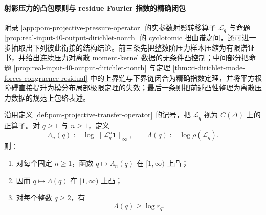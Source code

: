 \paragraph{射影压力的凸包原则与 residue Fourier 指数的精确闭包}
附录 \ref{app:pom-projective-pressure-operator} 的实参数射影转移算子 \(\mathcal L_q\) 与命题 \ref{prop:real-input-40-output-dirichlet-nonrh} 的 cyclotomic 扭曲谱之间，还可进一步抽取出下列彼此衔接的结构结论。前三条先把整数阶压力样本压缩为有限谱证书，并给出连续压力对离散 moment-kernel 数据的无条件凸控制；中间部分把命题 \ref{prop:real-input-40-output-dirichlet-nonrh} 与定理 \ref{thm:xi-dirichlet-mode-forces-congruence-residual} 中的上界链与下界链闭合为精确指数定理，并将平方根障碍直接提升为模分布局部极限定理的失效；最后一条则把前述凸性整理为离散压力数据的规范上包络表述。

\begin{theorem}\label{thm:xi-projective-pressure-path-holder-convexity}
沿用定义 \ref{def:pom-projective-transfer-operator} 的记号，把 \(\mathcal L_q\) 视为 \(C(\Delta)\) 上的正算子。对 \(q\ge 1\) 与 \(n\ge 1\)，定义
\[
\Lambda_n(q):=\log \|\mathcal L_q^n\mathbf 1\|_\infty,
\qquad
\Lambda(q):=\log \rho(\mathcal L_q).
\]
则：
\begin{enumerate}
  \item 对每个固定 \(n\ge 1\)，函数 \(q\mapsto \Lambda_n(q)\) 在 \([1,\infty)\) 上凸；
  \item 因而 \(q\mapsto \Lambda(q)\) 在 \([1,\infty)\) 上凸；
  \item 对每个整数 \(q\ge 2\)，有
  \[
  \Lambda(q)\ge \log r_q.
  \]
\end{enumerate}
\end{theorem}
